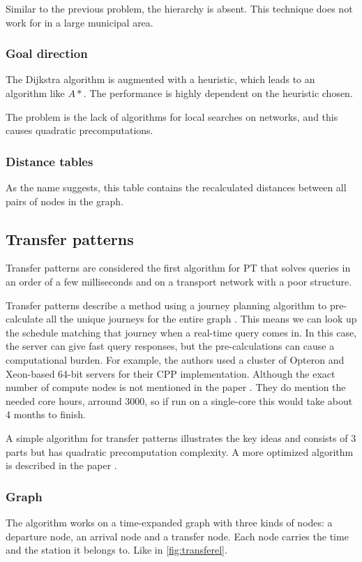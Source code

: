 Similar to the previous problem, the hierarchy is absent. This technique does not work for  in a large municipal area.
\subsubsection{Goal direction}
The Dijkstra algorithm is augmented with a heuristic, which leads to an algorithm like $ A*$. The performance is highly dependent on the heuristic chosen.

The problem is the lack of algorithms for local searches on  networks, and this causes quadratic precomputations.
\subsubsection{Distance tables}
As the name suggests, this table contains the recalculated distances between all pairs of nodes in the graph. 

\subsection{Transfer patterns}
Transfer patterns are considered the first algorithm for PT that solves queries in an order of a few milliseconds and on a transport network with a poor structure. 

Transfer patterns describe a method using a journey planning algorithm to pre-calculate all the unique journeys for the entire graph \cite{bast_fast_2010} %
. This means we can look up the schedule matching that journey when a real-time query comes in. In this case, the server can give fast query responses, but the pre-calculations can cause a computational burden. For example, the authors used a cluster of Opteron and Xeon-based 64-bit servers for their CPP implementation. Although the exact number of compute nodes is not mentioned in the paper \cite{bast_fast_2010}. They do mention the needed core hours, arround 3000, so if run on a single-core this would take about 4 months to finish.  


A simple algorithm for transfer patterns illustrates the key ideas and consists of 3 parts but has quadratic precomputation complexity. A more optimized algorithm is described in the paper \cite{bast_fast_2010}.
\subsubsection{Graph}
The algorithm works on a time-expanded graph with three kinds of nodes: a departure node, an arrival node and a transfer node. Each node carries the time and the station it belongs to. Like in \autoref{fig:transferel}.

